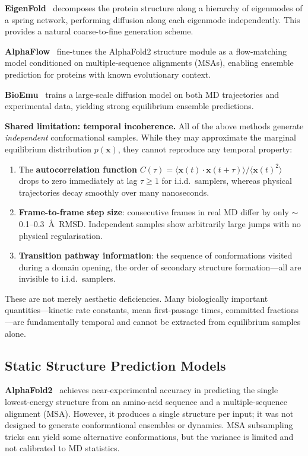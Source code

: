 \documentclass[11pt,a4paper]{article}
\newcommand{\bx}{\mathbf{x}}
\begin{document}
\textbf{EigenFold}~\cite{jing2023eigenfold} decomposes the protein structure along a hierarchy of
eigenmodes of a spring network, performing diffusion along each eigenmode independently.  This
provides a natural coarse-to-fine generation scheme.

\textbf{AlphaFlow}~\cite{jing2024alphaflow} fine-tunes the AlphaFold2 structure module as a
flow-matching model conditioned on multiple-sequence alignments (MSAs), enabling
ensemble prediction for proteins with known evolutionary context.

\textbf{BioEmu}~\cite{lewis2025bioemu} trains a large-scale diffusion model on both MD trajectories
and experimental data, yielding strong equilibrium ensemble predictions.

\textbf{Shared limitation: temporal incoherence.}  All of the above methods generate \emph{independent}
conformational samples.  While they may approximate the marginal equilibrium distribution $p(\bx)$,
they cannot reproduce any temporal property:
\begin{enumerate}[leftmargin=2em]
  \item The \textbf{autocorrelation function} $C(\tau) = \langle \bx(t) \cdot \bx(t+\tau) \rangle /
    \langle \bx(t)^2 \rangle$ drops to zero immediately at lag $\tau \geq 1$ for i.i.d.\
    samplers, whereas physical trajectories decay smoothly over many nanoseconds.
  \item \textbf{Frame-to-frame step size}: consecutive frames in real MD differ by only
    $\sim$0.1--0.3~\AA\ RMSD.  Independent samples show arbitrarily large jumps with no
    physical regularisation.
  \item \textbf{Transition pathway information}: the sequence of conformations visited during a
    domain opening, the order of secondary structure formation---all are invisible to i.i.d.\ samplers.
\end{enumerate}
These are not merely aesthetic deficiencies.  Many biologically important quantities---kinetic rate
constants, mean first-passage times, committed fractions---are fundamentally temporal and cannot be
extracted from equilibrium samples alone.

\subsection{Static Structure Prediction Models}

\textbf{AlphaFold2}~\cite{jumper2021} achieves near-experimental accuracy in predicting the single
lowest-energy structure from an amino-acid sequence and a multiple-sequence alignment (MSA).
However, it produces a single structure per input; it was not designed to generate conformational
ensembles or dynamics.  MSA subsampling tricks can yield some alternative conformations, but the
variance is limited and not calibrated to MD statistics.
\end{document}
